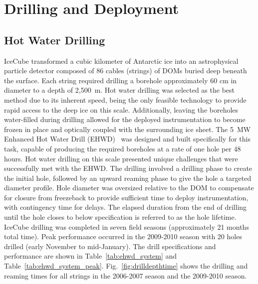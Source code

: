 
\section{Drilling and Deployment}

\subsection{\label{sec:hot_water_drilling}Hot Water Drilling}

IceCube transformed a cubic kilometer of Antarctic ice into an astrophysical particle detector composed of 86 cables (strings) of DOMs buried deep beneath the surface.  Each string required drilling a borehole approximately 60 cm in diameter to a depth of 2,500~m. Hot water drilling was selected as the best method due to its inherent speed, being the only feasible technology to provide rapid access to the deep ice on this scale.  Additionally, leaving the boreholes water-filled during drilling allowed for the deployed instrumentation to become frozen in place and optically coupled with the surrounding ice sheet. The 5~MW Enhanced Hot Water Drill (EHWD)~\cite{ehwd} was designed and built specifically for this task, capable of producing the required boreholes at a rate of one hole per 48 hours. Hot water drilling on this scale presented unique challenges that were successfully met with the EHWD. The drilling involved a drilling phase to create the initial hole, followed by an upward reaming phase to give the hole a targeted diameter profile.  Hole diameter was oversized relative to the DOM to compensate for closure from freezeback to provide sufficient time to deploy instrumentation, with contingency time for delays.  The elapsed duration from the end of drilling until the hole closes to below specification is referred to as the hole lifetime. IceCube drilling was completed in seven field seasons (approximately 21 months total time).  Peak performance occurred in the 2009-2010 season with 20 holes drilled (early November to mid-January).  The drill specifications and performance are shown in Table~\ref{tab:ehwd_system} and Table~\ref{tab:ehwd_system_peak}. Fig.~\ref{fig:drilldepthtime} shows the drilling and reaming times for all strings in the 2006-2007 season and the 2009-2010 season.

